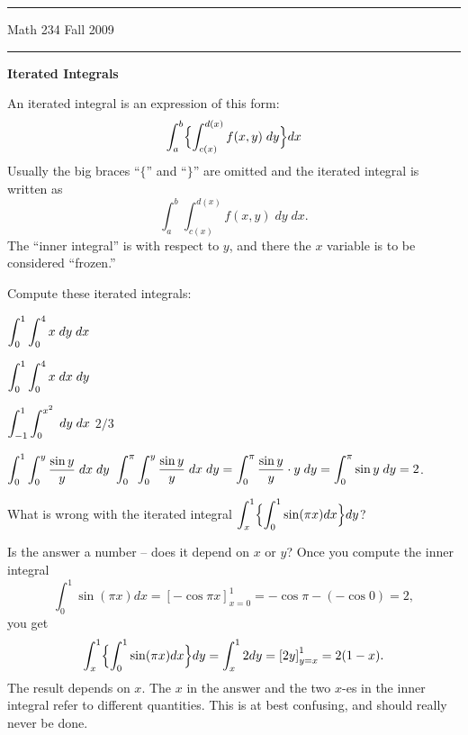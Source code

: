 \documentclass[11pt]{amsart}
\newcommand\semester{Fall 2009}
\begin{document}
\hrule

\vspace{3pt}\noindent
Math 234 \hfill \semester%
\vspace{3pt}\noindent
\hrule
\bigskip
\begin{center}
  \bfseries Iterated Integrals
\end{center}
\bigskip

An iterated integral is an expression of this form:
\[
\int_a^b\Bigl\{\int_{c(x)}^{d(x)} f(x, y) \; dy \Bigr\}dx
\]
Usually the big braces ``$\{$'' and ``$\}$'' are omitted and the
iterated integral is written as
\[
\int_a^b\int_{c(x)}^{d(x)} f(x, y) \; dy\; dx.
\]
The ``inner integral'' is with respect to $y$, and there the
$x$ variable is to be considered ``frozen.''
\vfill

\problem Compute these iterated integrals: %
\bigskip

\subprob $\displaystyle \int_0^1 \int_0^4 x \;dy\; dx$ %

\endanswer

\subprob $\displaystyle \int_0^1 \int_0^4 x \;dx\; dy$ %

\endanswer

\subprob $\displaystyle \int_{-1}^1 \int_0^{x^2} \; dy\;  dx$ %
\answer
$2/3$
\endanswer

\subprob $\displaystyle \int_0^1 \int _0^y \frac{\sin y}{y}\; dx\; dy$ %
\answer
$\displaystyle \int_0^\pi \int _0^y \frac{\sin y}{y}\; dx\; dy
=
\int_0^\pi \frac{\sin y}{y} \cdot y \; dy = \int_0^\pi \sin y \; dy =
2$.
\endanswer

\vfill

\problem What is wrong with the iterated integral %
$\displaystyle\int_x^1 \Bigl\{\int_0^1 \sin(\pi x) dx \Bigr\}dy$? 

Is the answer a number -- does it depend on $x$ or $y$?
\answer
Once you compute the inner integral
\[
\int_0^1 \sin(\pi x) dx  = \left[ -\cos\pi x \right]_{x=0}^1
=-\cos \pi - (-\cos 0) = 2,
\]
you get 
\[
\int_x^1 \Bigl\{\int_0^1 \sin(\pi x) dx \Bigr\}dy
=\int_x^1 2dy = \left[ 2y \right]_{y=x}^1 = 2(1-x).
\]
The result depends on $x$.  The $x$ in the answer and the two $x$-es
in the inner integral refer to different quantities.  This is at best
confusing, and should really never be done.
\endanswer

\vfill
\end{document}
